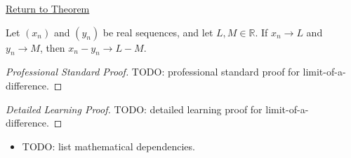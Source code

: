 \newpage
{}
\label{prf:limit-of-a-difference}

\begin{remark*}[Return]
\hyperref[thm:limit-of-a-difference]{Return to Theorem}
\end{remark*}

\begin{theorem*}
Let $(x_n)$ and $(y_n)$ be real sequences, and let $L,M\in\mathbb{R}$.
If $x_n\to L$ and $y_n\to M$, then $x_n-y_n\to L-M$.

\smallskip
\noindent
\end{theorem*}

\begin{proof}[Professional Standard Proof]
\LRAProofBodyStart
TODO: professional standard proof for limit-of-a-difference.
\end{proof}

\begin{proof}[Detailed Learning Proof]
\LRAProofBodyStart
TODO: detailed learning proof for limit-of-a-difference.
\end{proof}

\begin{remark*}
\end{remark*}

\begin{dependencies}
\begin{itemize}
  \item TODO: list mathematical dependencies.
\end{itemize}
\end{dependencies}

\clearpage
